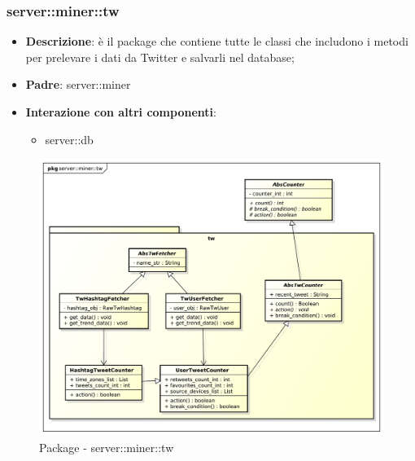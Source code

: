\subsubsection{server::miner::tw} %
\label{ssub:bdsm_app_server_miner_tw}

\begin{itemize}
	\item \textbf{Descrizione}: è il package che contiene tutte le classi che includono i metodi per prelevare i dati da Twitter e salvarli nel database;
	\item \textbf{Padre}: server::miner
	\item \textbf{Interazione con altri componenti}:
		\begin{itemize}
			\item server::db
		\end{itemize}
\end{itemize}

	\begin{figure}[H]
		\centering
		\centerline{\includegraphics[scale=0.5]{./images/server/miner_tw.pdf}}
		\caption{Package - server::miner::tw}
	\end{figure}

